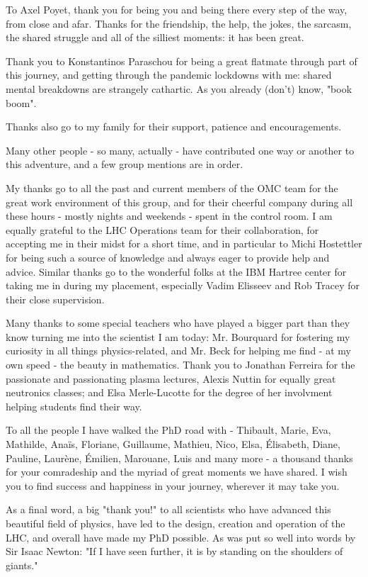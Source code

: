 \begin{acknowledgements}
To Axel Poyet, thank you for being you and being there every step of the way, from close and afar.
Thanks for the friendship, the help, the jokes, the sarcasm, the shared struggle and all of the silliest moments: it has been great.

Thank you to Konstantinos Paraschou for being a great flatmate through part of this journey, and getting through the pandemic lockdowns with me: shared mental breakdowns are strangely cathartic.
As you already (don't) know, "book boom".

Thanks also go to my family for their support, patience and encouragements.
\newline

Many other people - so many, actually - have contributed one way or another to this adventure, and a few group mentions are in order.
\newline

My thanks go to all the past and current members of the OMC team for the great work environment of this group, and for their cheerful company during all these hours - mostly nights and weekends - spent in the control room.
I am equally grateful to the LHC Operations team for their collaboration, for accepting me in their midst for a short time, and in particular to Michi Hostettler for being such a source of knowledge and always eager to provide help and advice.
Similar thanks go to the wonderful folks at the IBM Hartree center for taking me in during my placement, especially Vadim Elisseev and Rob Tracey for their close supervision.

Many thanks to some special teachers who have played a bigger part than they know turning me into the scientist I am today: Mr. Bourquard for fostering my curiosity in all things physics-related, and Mr. Beck for helping me find - at my own speed - the beauty in mathematics.
Thank you to Jonathan Ferreira for the passionate and passionating plasma lectures, Alexis Nuttin for equally great neutronics classes; and Elsa Merle-Lucotte for the degree of her involvment helping students find their way.

To all the people I have walked the PhD road with - Thibault, Marie, Eva, Mathilde, Anaïs, Floriane, Guillaume, Mathieu, Nico, Elsa, Élisabeth, Diane, Pauline, Laurène, Émilien, Marouane, Luis and many more - a thousand thanks for your comradeship and the myriad of great moments we have shared.
I wish you to find success and happiness in your journey, wherever it may take you.
\newline

As a final word, a big "thank you!" to all scientists who have advanced this beautiful field of physics, have led to the design, creation and operation of the LHC, and overall have made my PhD possible.
As was put so well into words by Sir Isaac Newton: "If I have seen further, it is by standing on the shoulders of giants."

\end{acknowledgements}